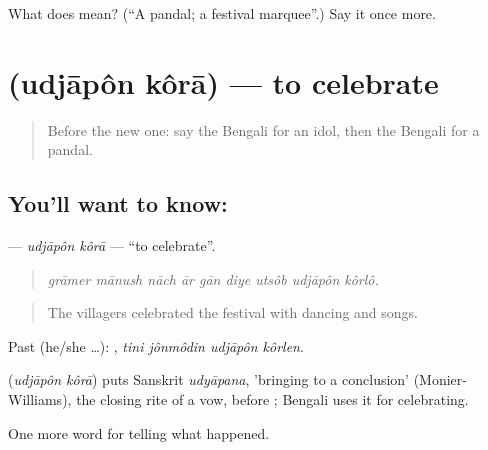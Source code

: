 \begin{tcolorbox}[breakable,colback=teal!4,colframe=teal!35!black,title={Before you move on}]
What does  mean? (\textquotedblleft{}A pandal; a festival marquee\textquotedblright{}.) Say it once more.
\end{tcolorbox}
\section[\texorpdfstring{\bn{উদযাপন} \bn{করা} (udjāpôn kôrā)}{উদযাপন করা (udjāpôn kôrā)}]{  (udjāpôn kôrā) — to celebrate}

\label{lesson:BN-C304-udjapon-kora}



\begin{quote}
Before the new one: say the Bengali for an idol, then the Bengali for a pandal.
\end{quote}

\subsection*{You'll want to know:  }
\textbf{ } — \emph{udjāpôn kôrā} — \textquotedblleft{}to celebrate\textquotedblright{}.

\begin{quote}
        
\end{quote}

\begin{quote}
\emph{grāmer mānush nāch ār gān diye utsôb udjāpôn kôrlô.}
\end{quote}

\begin{quote}
The villagers celebrated the festival with dancing and songs.
\end{quote}

Past (he/she …):    , \emph{tini jônmôdin udjāpôn kôrlen}.

\begin{cousinweb}
\textbf{ } (\emph{udjāpôn kôrā}) puts Sanskrit \emph{udyāpana}, 'bringing to a conclusion' (Monier-Williams), the closing rite of a vow, before ; Bengali uses it for celebrating.
\end{cousinweb}

\begin{grammarlens}[title={What you've built}]
One more word for telling what happened.
\end{grammarlens}

